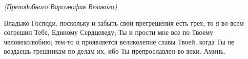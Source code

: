 \normalfont{} 


\bigskip\bigskip\mychapterending

 


\itshape (Преподобного Варсонофия Великого) 

\normalfont{}

Владыко Господи, поскольку и забыть свои прегрешения есть грех, то я во всем согрешил Тебе, Единому Сердцеведу; Ты и прости мне все по Твоему человеколюбию; тем-то и проявляется великолепие славы Твоей, когда Ты не воздаешь грешникам по делам их, ибо Ты препрославлен во веки. Аминь. 


\bigskip\bigskip\mychapterending
